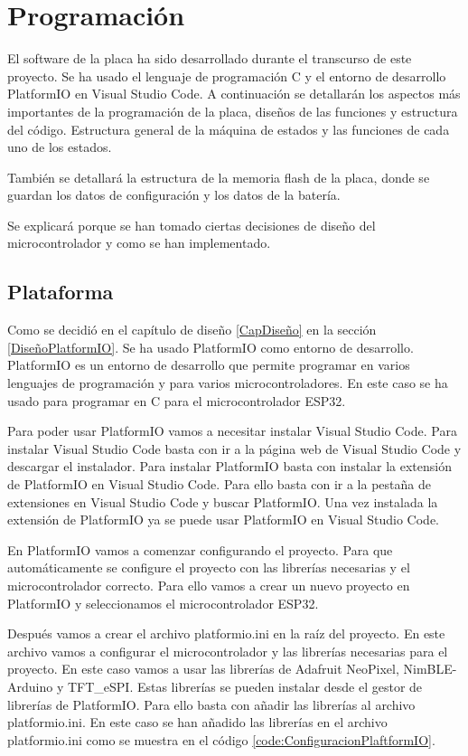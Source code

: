 \chapter{Programación}

El software de la placa ha sido desarrollado durante el transcurso de este proyecto. Se ha usado el lenguaje de programación C y el entorno de desarrollo PlatformIO en Visual Studio Code. A continuación se detallarán los aspectos más importantes de la programación de la placa, diseños de las funciones y estructura del código. Estructura general de la máquina de estados y las funciones de cada uno de los estados.

También se detallará la estructura de la memoria flash de la placa, donde se guardan los datos de configuración y los datos de la batería.

Se explicará porque se han tomado ciertas decisiones de diseño del microcontrolador y como se han implementado.

\section{Plataforma}
Como se decidió en el capítulo de diseño \ref{CapDiseño} en la sección \ref{DiseñoPlatformIO}. Se ha usado PlatformIO como entorno de desarrollo. PlatformIO es un entorno de desarrollo que permite programar en varios lenguajes de programación y para varios microcontroladores. En este caso se ha usado para programar en C para el microcontrolador ESP32.

Para poder usar PlatformIO vamos a necesitar instalar Visual Studio Code. Para instalar Visual Studio Code basta con ir a la página web de Visual Studio Code y descargar el instalador. Para instalar PlatformIO basta con instalar la extensión de PlatformIO en Visual Studio Code. Para ello basta con ir a la pestaña de extensiones en Visual Studio Code y buscar PlatformIO. Una vez instalada la extensión de PlatformIO ya se puede usar PlatformIO en Visual Studio Code.

En PlatformIO vamos a comenzar configurando el proyecto. Para que automáticamente se configure el proyecto con las librerías necesarias y el microcontrolador correcto. Para ello vamos a crear un nuevo proyecto en PlatformIO y seleccionamos el microcontrolador ESP32.

Después vamos a crear el archivo platformio.ini en la raíz del proyecto. En este archivo vamos a configurar el microcontrolador y las librerías necesarias para el proyecto. En este caso vamos a usar las librerías de Adafruit NeoPixel, NimBLE-Arduino y TFT\_eSPI. Estas librerías se pueden instalar desde el gestor de librerías de PlatformIO. Para ello basta con añadir las librerías al archivo platformio.ini. En este caso se han añadido las librerías en el archivo platformio.ini como se muestra en el código \ref{code:ConfiguracionPlaftformIO}.

